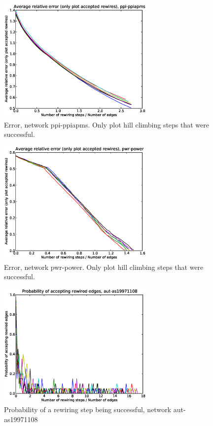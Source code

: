 \begin{figure}[p]
\centering
\includegraphics[width=3in]{Figures/acceptedOnly-ppi-ppiapms.eps}
\caption{Error, network ppi-ppiapms.  Only plot hill climbing steps that were successful.}
\label{fig:errors-ppi-ppiapms}
\end{figure}

\begin{figure}[p]
\centering
\includegraphics[width=3in]{Figures/acceptedOnly-pwr-power.eps}
\caption{Error, network pwr-power.  Only plot hill climbing steps that were successful.}
\label{fig:errors-pwr-power}
\end{figure}

\begin{figure}[p]
\centering
\includegraphics[width=3in]{Figures/Paccept-aut-as19971108.eps}
\caption{Probability of a rewiring step being successful, network aut-as19971108}
\label{fig:Paccept-aut-as19971108}
\end{figure}

